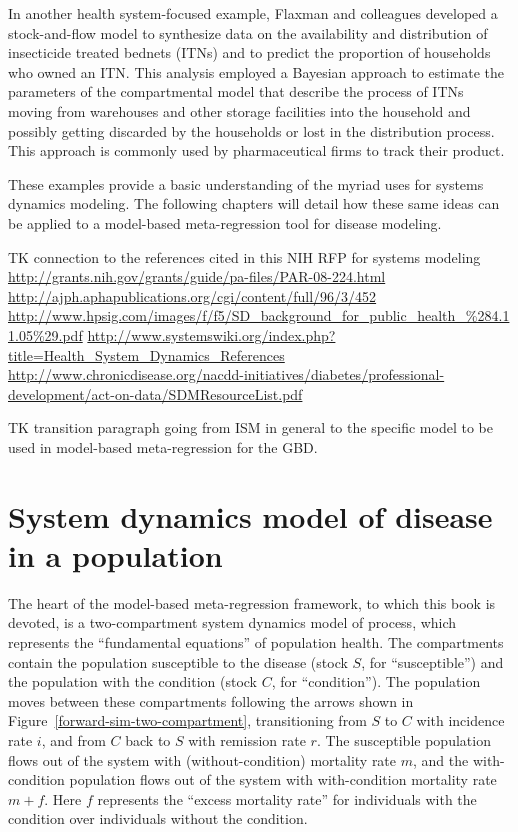 In another health system-focused example, Flaxman and colleagues
developed a stock-and-flow model to synthesize data on the
availability and distribution of insecticide treated bednets (ITNs)
and to predict the proportion of households who owned an ITN. This
analysis employed a Bayesian approach to estimate the parameters of
the compartmental model that describe the process of ITNs moving from
warehouses and other storage facilities into the household and
possibly getting discarded by the households or lost in the
distribution process.  This approach is commonly used by
pharmaceutical firms to track their product.

These examples provide a basic understanding of the myriad uses for
systems dynamics modeling. The following chapters will detail how
these same ideas can be applied to a model-based meta-regression tool
for disease modeling.




TK connection to the references cited in this NIH RFP for systems modeling
\url{http://grants.nih.gov/grants/guide/pa-files/PAR-08-224.html}
\url{http://ajph.aphapublications.org/cgi/content/full/96/3/452}
\url{http://www.hpsig.com/images/f/f5/SD_background_for_public_health_%284.11.05%29.pdf}
\url{http://www.systemswiki.org/index.php?title=Health_System_Dynamics_References}
\url{http://www.chronicdisease.org/nacdd-initiatives/diabetes/professional-development/act-on-data/SDMResourceList.pdf}



TK transition paragraph going from ISM in general to the specific
model to be used in model-based meta-regression for the GBD.

\section{System dynamics model of disease in a population}

The heart of the model-based meta-regression framework, to which this
book is devoted, is a two-compartment system dynamics model of
process, which represents the ``fundamental equations'' of population
health. The compartments contain the population susceptible to the
disease (stock $S$, for ``susceptible'') and the population with the
condition (stock $C$, for ``condition''). The population moves between
these compartments following the arrows shown in
Figure~\ref{forward-sim-two-compartment}, transitioning from $S$ to
$C$ with incidence rate $i$, and from $C$ back to $S$ with remission
rate $r$. The susceptible population flows out of the system with
(without-condition) mortality rate $m$, and the with-condition
population flows out of the system with with-condition mortality rate
$m+f$.  Here $f$ represents the ``excess mortality rate'' for
individuals with the condition over individuals without the condition.

